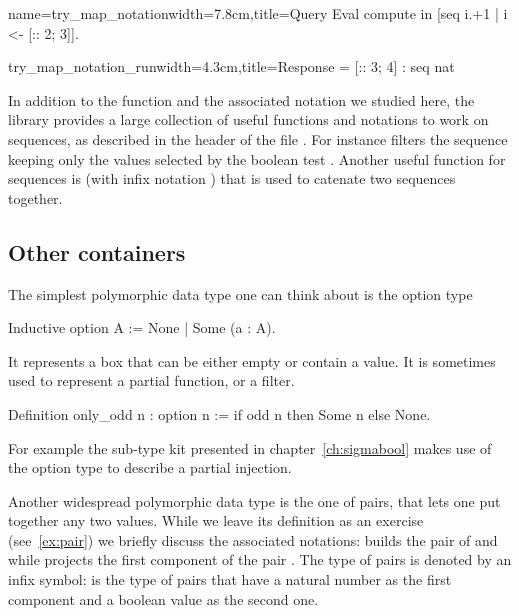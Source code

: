 \begin{coq}{name=try_map_notation}{width=7.8cm,title=Query}
Eval compute in [seq i.+1 | i <- [:: 2; 3]].
\end{coq}
\begin{coqout}{try_map_notation_run}{width=4.3cm,title=Response}
= [:: 3; 4] : seq nat
\end{coqout}
\index[coq]{\C{[seq .. "| .. <- ..]}}
In addition to the function  and the associated notation
we studied here, the \mcbMC{} library
provides a large collection of useful functions and notations to work on
sequences, as described in the header of the file .  For
instance \C{[seq i <- s | p]} filters the sequence  keeping only
the values selected by the boolean test .
Another useful function for sequences is  (with infix notation \C{++})
that is used to catenate two sequences together.
\index[coq]{\C{(_ ++ _)}}
\index[coq]{\C{[seq .. <- .. "| ..]}}

\subsection{Other containers}\label{sec:othercontainers}
The simplest polymorphic data type one can think about is the option type

\begin{coq}{}{}
Inductive option A := None | Some (a : A).
\end{coq}
It represents a box that can be either empty or contain a value.
It is sometimes used to represent a partial function, or a filter.

\begin{coq}{}{}
Definition only_odd n : option n := if odd n then Some n else None.
\end{coq}
For example the sub-type kit presented in chapter~\ref{ch:sigmabool} makes use
of the option type to describe a partial injection.

Another widespread polymorphic data type is the one of pairs, that
lets one put together any two values.  While we leave its definition
as an exercise (see~\ref{ex:pair}) we briefly discuss the associated
notations:  builds the pair of  and  while 
projects the first component of the pair .  The type of pairs is
denoted by an infix \C{*} symbol:  is the type of
pairs that have a natural number as the first component and a boolean
value as the second one.

